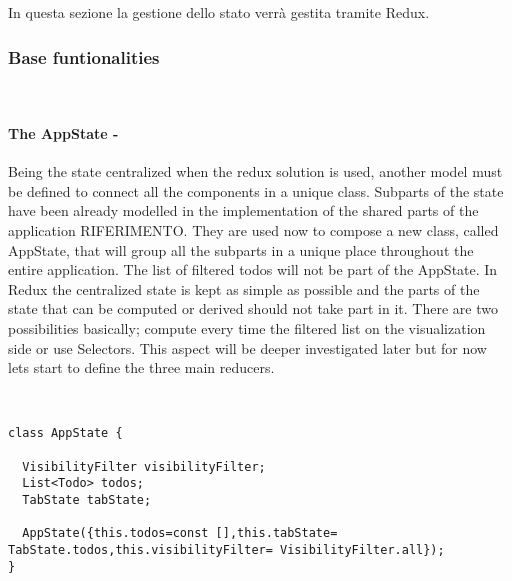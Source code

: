 In questa sezione la gestione dello stato verrà gestita tramite Redux.
\subsubsection{Base funtionalities} \mbox{}\\ \label{par:todo_app_inherited_widget_introduction}
\paragraph{The AppState - }
\label{subpar:todo_app_bloc_core_state}
Being the state centralized when the redux solution is used, another model must be defined to connect all the components in a unique class. Subparts of the state have been already modelled in the implementation of the shared parts of the application RIFERIMENTO. They are used now to compose a new class, called AppState, that will group all the subparts in a unique place throughout the entire application. The list of filtered todos will not be part of the AppState. In Redux the centralized state is kept as simple as possible and the parts of the state that can be computed or derived should not take part in it. There are two possibilities basically; compute every time the filtered list on the visualization side or use Selectors. This aspect will be deeper investigated later but for now lets start to define the three main reducers.
\begin{code}
\mbox{}\\
 \mbox{}
		\label{code:2.14}
\begin{verbatim}
class AppState {

  VisibilityFilter visibilityFilter;
  List<Todo> todos;
  TabState tabState;

  AppState({this.todos=const [],this.tabState= TabState.todos,this.visibilityFilter= VisibilityFilter.all});
}
\end{verbatim}
\mbox{}
\end{code}

